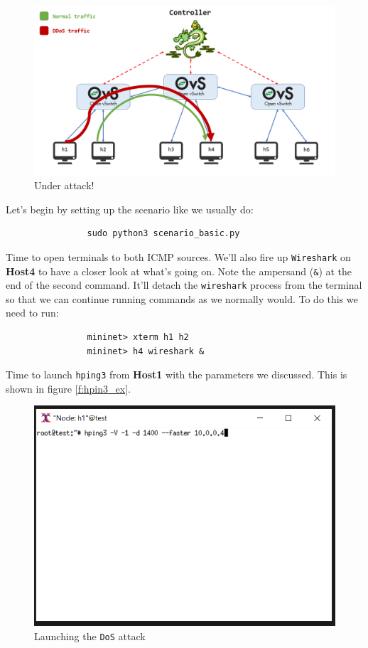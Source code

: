 \documentclass[12pt]{report}
\begin{document}
			\begin{figure}
				\centering
				\includegraphics[scale = 1]{scenario_ddos.png}
				\caption{Under attack!}
				\label{f:dos_atk}
			\end{figure}

			Let's begin by setting up the scenario like we usually do:

			\begin{verbatim}
				sudo python3 scenario_basic.py
			\end{verbatim}

			Time to open terminals to both ICMP sources. We'll also fire up \texttt{Wireshark} on \textbf{Host4} to have a closer look at what's going on. Note the ampersand (\texttt{&}) at the end of the second command. It'll detach the \texttt{wireshark} process from the terminal so that we can continue running commands as we normally would. To do this we need to run:

			\begin{verbatim}
				mininet> xterm h1 h2
				mininet> h4 wireshark &
			\end{verbatim}

			Time to launch \texttt{hping3} from \textbf{Host1} with the parameters we discussed. This is shown in figure \ref{f:hpin3_ex}.

			\begin{figure}
				\centering
				\includegraphics[scale = 1]{launch_hping3.png}
				\caption{Launching the \texttt{DoS} attack}
				\label{f:hping3_ex}
			\end{figure}
\end{document}
